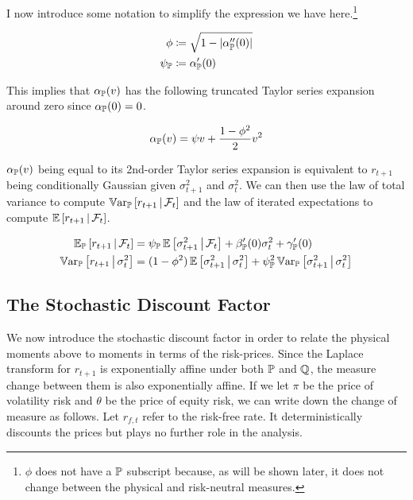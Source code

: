 \documentclass[11pt, letterpaper, twoside, final]{article}
\begin{document}
I now introduce some notation to simplify the expression we have here.\footnote{$\phi$ does not have a $\mathbb{P}$
subscript because, as will be shown later, it does not change between the physical and risk-neutral measures.}

\begin{align}
    \phi &\coloneqq \sqrt{1 - \lvert\alpha_{\mathbb{P}}''(0)\rvert} \\
    \psi_{\mathbb{P}} &\coloneqq \alpha_{\mathbb{P}}'(0)
\end{align}

This implies that $\alpha_{\mathbb{P}}(v)$ has the following truncated Taylor series expansion around zero since
$\alpha_{\mathbb{P}}(0) = 0$.

\begin{equation}
    \label{eqn:alpha_PP_expansion}
    \alpha_{\mathbb{P}}(v) = \psi v + \frac{1 - \phi^2}{2} v^2
\end{equation}

$\alpha_{\mathbb{P}}(v)$ being equal to its 2nd-order Taylor series expansion is equivalent to $r_{t+1}$ being
conditionally Gaussian given $\sigma^2_{t+1}$ and $\sigma^2_t$.
We can then use the law of total variance to compute $\operatorname{\mathbb{V}ar}_{\mathbb{P}}\left[r_{t+1} \,\middle\vert\, \mathcal{F}_t\right]$ and the law of
iterated expectations to compute $\operatorname{\mathbb{E}}\left[r_{t+1} \,\middle\vert\, \mathcal{F}_t \right]$.

\begin{align}
    \label{eqn:lie_expected_rtn}
    \E_{\PP}\left[r_{t+1} \mvert \F_t\right] &= \psi_{\PP} \E\left[\sigma^2_{t+1} \mvert \F_t\right]  +
    \beta_{\PP}'(0) \sigma^2_t + \gamma_{\PP}'(0)  \\
%
    \label{eqn:ltv_rtn_variance}
    \Var_{\PP}\left[r_{t+1} \mvert \sigma^2_t\right]  &= (1 - \phi^2) \E \left[\sigma^2_{t+1} \mvert \sigma^2_t
    \right] + \psi_{\PP}^2 \Var_{\PP}\left[\sigma^2_{t+1} \mvert \sigma^2_t \right] 
\end{align}

\subsection{The Stochastic Discount Factor}\label{sec:deriving_sdf_functions}

We now introduce the stochastic discount factor in order to relate the physical moments above to moments in terms
of the risk-prices.
Since the Laplace transform for $r_{t+1}$  is exponentially affine under both $\mathbb{P}$ and $\mathbb{Q}$, the measure change
between them is also exponentially affine.
If we let $\pi$ be the price of volatility risk and $\theta$ be the price of equity risk, we can write down the
change of measure as follows.
Let $r_{f,t}$ refer to the risk-free rate.
It deterministically discounts the prices but plays no further role in the analysis.
\end{document}

